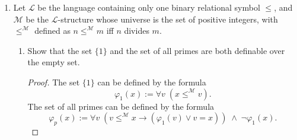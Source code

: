 \documentclass{article}
\begin{document}
\begin{enumerate}
  \item Let $\mathcal{L}$ be the language containing only one binary
    relational symbol $\leq$, and $\mathcal{M}$ be the
    $\mathcal{L}$-structure whose universe is the set of positive
    integers, with $\leq^{\mathcal{M}}$ defined as $n\leq^{\mathcal{M}}m$
    iff $n$ divides $m$.

    \begin{enumerate}
      \item Show that the set $\{1\}$ and the set of all primes are both
        definable over the empty set.
        \begin{proof}
          The set $\{1\}$ can be defined by the formula
          \begin{equation*}
            \varphi_1(x) := \forall v\; (x\leq^{\mathcal{M}} v).
          \end{equation*}
          The set of all primes can be defined by the formula
          \begin{equation*}
            \varphi_p(x) := \forall v\; (v\leq^{\mathcal{M}}x \rightarrow
            (\varphi_1(v) \vee v=x))\; \wedge\; \neg\varphi_1(x).
          \end{equation*}
        \end{proof}


\end{enumerate}
\end{enumerate}
\end{document}
